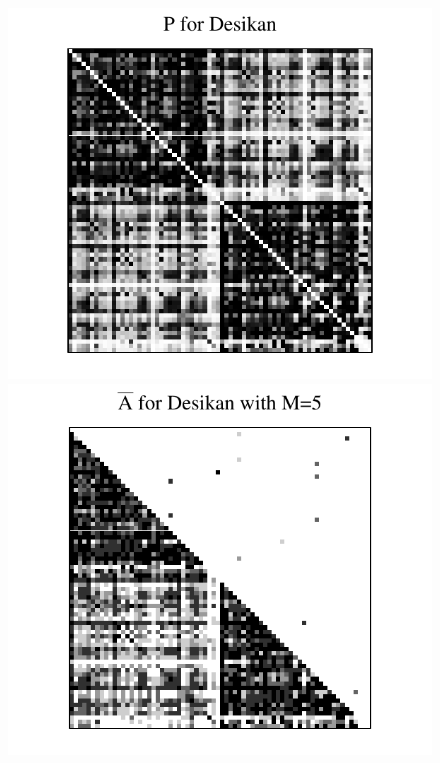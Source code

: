 \documentclass[10pt,letterpaper]{article}
\begin{document}
\begin{figure}[!tbp]
\centering
\includegraphics[height=.2\textheight]{P_desikan.pdf} \hspace{-35pt}
\includegraphics[height=.201\textheight]{Abar_desikan_m5.pdf} \hspace{-35pt}

\end{figure}
\end{document}
